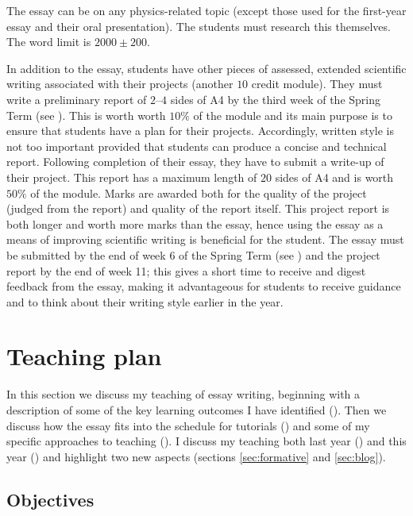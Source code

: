 The essay can be on any physics-related topic (except those used for the first-year essay and their oral presentation). The students must research this themselves. The word limit is $2000 \pm 200$. 

In addition to the essay, students have other pieces of assessed, extended scientific writing associated with their projects (another $10$ credit module). They must write a preliminary report of $2$--$4$ sides of A4 by the third week of the Spring Term (see ). This is worth worth $10\%$ of the module and its main purpose is to ensure that students have a plan for their projects. Accordingly, written style is not too important provided that students can produce a concise and technical report. Following completion of their essay, they have to submit a write-up of their project. This report has a maximum length of $20$ sides of A4 and is worth $50\%$ of the module. Marks are awarded both for the quality of the project (judged from the report) and quality of the report itself. This project report is both longer and worth more marks than the essay, hence using the essay as a means of improving scientific writing is beneficial for the student. The essay must be submitted by the end of week 6 of the Spring Term (see ) and the project report by the end of week 11; this gives a short time to receive and digest feedback from the essay, making it advantageous for students to receive guidance and to think about their writing style earlier in the year.


\section{Teaching plan}\label{sec:essay-teach}

In this section we discuss my teaching of essay writing, beginning with a description of some of the key learning outcomes I have identified (). Then we discuss how the essay fits into the schedule for tutorials () and some of my specific approaches to teaching (). I discuss my teaching both last year () and this year () and highlight two new aspects (sections \ref{sec:formative} and \ref{sec:blog}).

\subsection{Objectives}\label{sec:essay-aims}

